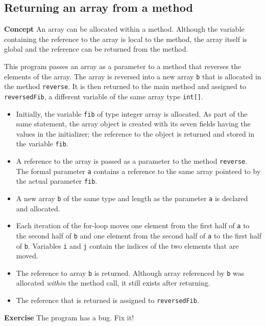 \subsection{Returning an array from a method}\label{array.04}

\textbf{Concept} An array can be allocated within a method. Although the variable 
containing the reference to the array is local to the method, the array 
itself is global and the reference can be returned from the method.


This program passes an array as a parameter to a method that reverses the elements of the array. The array is reversed into a new array \texttt{b} that is allocated in the method \texttt{reverse}. It is then returned to the main method and assigned to \texttt{reversedFib}, a  different variable of the same array type \texttt{int[]}.
\begin{itemize}
\item Initially, the variable \texttt{fib} of type integer array is 
allocated. As part of the same statement, the array object is created with 
its seven fields having the values in the initializer; the reference to 
the object is returned and stored in the variable \texttt{fib}.
\item A reference to the array is passed as a parameter to the method 
\texttt{reverse}. The formal parameter \texttt{a} contains a reference to the same array pointeed to by the actual parameter \texttt{fib}.
\item A new array \texttt{b} of the same type and length as the parameter \texttt{a} is declared and allocated.
\item Each iteration of the for-loop moves one element from the first half of \texttt{a} to the second half of \texttt{b} and one element from the second half of \texttt{a} to the first half of \texttt{b}. Variables \texttt{i} and \texttt{j} contain the indices of the two elements that are moved.
\item The reference to array \texttt{b} is returned.
Although array referenced by \texttt{b} was allocated \emph{within} the method call, it still exists after returning. 
\item The reference that is returned is assigned to \texttt{reversedFib}.
\end{itemize}

\textbf{Exercise} The program has a bug. Fix it!
